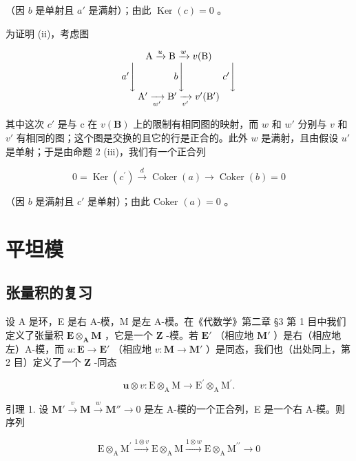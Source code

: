 （因 \(b\) 是单射且 \(a'\) 是满射）；由此 \(\operatorname{Ker}(c) = 0\) 。

为证明 (ii)，考虑图

\[
\begin{array}{c} \mathrm{A} \xrightarrow {u} \mathrm{B} \xrightarrow {w} v (\mathrm{B}) \\ a ^ {\prime} \Biggl \downarrow \qquad \qquad b \Biggl \downarrow \qquad \qquad c ^ {\prime} \Biggl \downarrow \\ \mathrm{A} ^ {\prime} \xrightarrow [ w ^ {\prime} ]{} \mathrm{B} ^ {\prime} \xrightarrow [ v ^ {\prime} ]{} v ^ {\prime} (\mathrm{B} ^ {\prime}) \end{array}
\]

其中这次 \(c'\) 是与 c 在 \(v(\mathbf{B})\) 上的限制有相同图的映射，而 \(w\) 和 \(w'\) 分别与 \(v\) 和 \(v'\) 有相同的图；这个图是交换的且它的行是正合的。此外 \(w\) 是满射，且由假设 \(u'\) 是单射；于是由命题 2 (iii)，我们有一个正合列

\[
0 = \operatorname{Ker} (c ^ {\prime}) \xrightarrow {d} \operatorname{Coker} (a) \longrightarrow \operatorname{Coker} (b) = 0
\]

（因 \(b\) 是满射且 \(c'\) 是单射）；由此 Coker \((a) = 0\) 。

\section{平坦模}

\subsection{张量积的复习}

设 A 是环，E 是右 A-模，M 是左 A-模。在《代数学》第二章 §3 第 1 目中我们定义了张量积 \(\mathbf{E} \otimes_{\mathbf{A}} \mathbf{M}\) ，它是一个 \(\mathbf{Z}\) -模。若 \(\mathbf{E}'\) （相应地 \(\mathbf{M}'\) ）是右（相应地左）A-模，而 \(u: \mathbf{E} \to \mathbf{E}'\) （相应地 \(v: \mathbf{M} \to \mathbf{M}'\) ）是同态，我们也（出处同上，第 2 目）定义了一个 \(\mathbf{Z}\) -同态

\[
\boldsymbol {u} \otimes v: \mathrm{E} \otimes_ {\mathrm{A}} \mathrm{M} \rightarrow \mathrm{E} ^ {\prime} \otimes_ {\mathrm{A}} \mathrm{M} ^ {\prime}.
\]

引理 1. 设 \(\mathbf{M}' \xrightarrow{v} \mathbf{M} \xrightarrow{w} \mathbf{M}'' \to 0\) 是左 A-模的一个正合列，E 是一个右 A-模。则序列

\[
\mathrm{E} \otimes_ {\mathrm{A}} \mathrm{M} ^ {\prime} \xrightarrow {1 \otimes v} \mathrm{E} \otimes_ {\mathrm{A}} \mathrm{M} \xrightarrow {1 \otimes w} \mathrm{E} \otimes_ {\mathrm{A}} \mathrm{M} ^ {\prime \prime} \longrightarrow 0
\]

